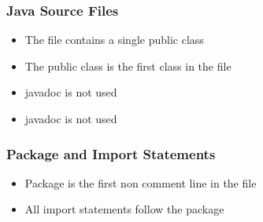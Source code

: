 \subsubsection{Java Source Files}
\begin{itemize}
\item The file contains  a single public class
\item The public class is the first class in the file
\item javadoc is not used
\item javadoc is not used
\end{itemize}


\subsubsection{Package and Import Statements}
\begin{itemize}
\item Package is the first non comment line in the file
\item All import statements follow the package
\end{itemize}



